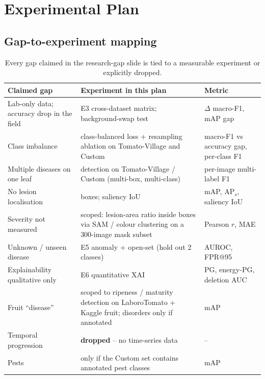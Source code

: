 \section{Experimental Plan}
\label{sec:experiments}

\subsection{Gap-to-experiment mapping}
\begin{table}[H]
\centering\small
\caption{Every gap claimed in the research-gap slide is tied to a measurable experiment or explicitly dropped.}\label{tab:gap_map}
\begin{tabular}{@{}L{4.6cm}L{6.2cm}L{4.4cm}@{}}
\toprule
Claimed gap & Experiment in this plan & Metric \\
\midrule
Lab-only data; accuracy drop in the field & E3 cross-dataset matrix; background-swap test & $\Delta$ macro-F1, mAP gap \\
Class imbalance & class-balanced loss + resampling ablation on Tomato-Village and Custom & macro-F1 vs accuracy gap, per-class F1 \\
Multiple diseases on one leaf & detection on Tomato-Village / Custom (multi-box, multi-class) & per-image multi-label F1 \\
No lesion localisation & \modeldet{} boxes; saliency IoU & mAP, AP$_s$, saliency IoU \\
Severity not measured & scoped: lesion-area ratio inside boxes via SAM / colour clustering on a 300-image mask subset & Pearson $r$, MAE \\
Unknown / unseen disease & E5 anomaly + open-set (hold out 2 classes) & AUROC, FPR@95 \\
Explainability qualitative only & E6 quantitative XAI & PG, energy-PG, deletion AUC \\
Fruit ``disease'' & scoped to ripeness / maturity detection on LaboroTomato + Kaggle fruit; disorders only if annotated & mAP \\
Temporal progression & \textbf{dropped} -- no time-series data & -- \\
Pests & only if the Custom set contains annotated pest classes & mAP \\
\bottomrule
\end{tabular}
\end{table}

